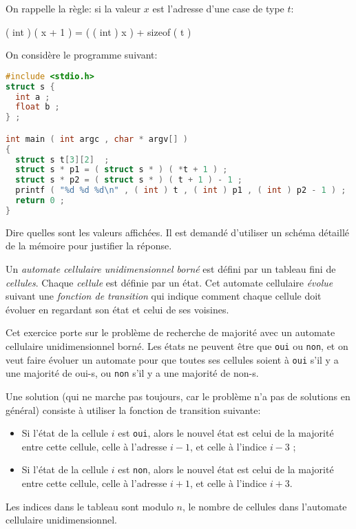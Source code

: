 

On rappelle la règle: si la valeur \(x\) est l'adresse d'une case de type \(t\):
\begin{center}
  ( int ) ( x + 1 ) = ( ( int ) x ) + sizeof ( t ) 
\end{center}


On considère le programme suivant:
\begin{lstlisting}[language=C]
#include <stdio.h>
struct s {
  int a ;
  float b ;
} ;

int main ( int argc , char * argv[] )
{
  struct s t[3][2]  ;
  struct s * p1 = ( struct s * ) ( *t + 1 ) ;
  struct s * p2 = ( struct s * ) ( t + 1 ) - 1 ;
  printf ( "%d %d %d\n" , ( int ) t , ( int ) p1 , ( int ) p2 - 1 ) ;
  return 0 ;
}
\end{lstlisting}

Dire quelles sont les valeurs affichées. Il est demandé d'utiliser un
schéma détaillé de la mémoire pour justifier la réponse.



  Un \emph{automate cellulaire unidimensionnel born{\'e}} est
  d{\'e}fini par un tableau fini de \emph{cellules}. Chaque \emph{cellule}
  est d{\'e}finie par un {\'e}tat. Cet automate cellulaire \emph{{\'e}volue} suivant une
  \emph{fonction de transition} qui indique comment chaque cellule doit 
  {\'e}voluer en regardant son {\'e}tat et celui de ses voisines.

  Cet exercice porte sur le probl{\`e}me de recherche de majorit{\'e} avec un
  automate cellulaire unidimensionnel born{\'e}. Les {\'e}tats ne peuvent
  {\^e}tre que \texttt{oui} ou \texttt{non}, et on veut faire {\'e}voluer un
  automate pour que toutes ses cellules soient {\`a} \texttt{oui} s'il y a
  une majorit{\'e} de oui-s, ou \texttt{non} s'il y a une majorit{\'e} de non-s.

  Une solution (qui ne marche pas toujours, car le probl{\`e}me n'a pas de
  solutions en g{\'e}n{\'e}ral) consiste {\`a} utiliser la fonction de transition
  suivante:
  \begin{itemize}
  \item Si l'{\'e}tat de la cellule $i$ est \texttt{oui}, alors le nouvel 
  {\'e}tat est celui de la majorit{\'e} entre cette cellule, celle {\`a} 
  l'adresse $i-1$, et celle {\`a} l'indice $i-3$ ;
  \item Si l'{\'e}tat de la cellule $i$ est \texttt{non}, alors le nouvel 
  {\'e}tat est celui de la majorit{\'e} entre cette cellule, celle {\`a} 
  l'adresse $i+1$, et celle {\`a} l'indice $i+3$.
  \end{itemize}
  Les indices dans le tableau sont modulo $n$, le nombre de cellules 
  dans l'automate cellulaire unidimensionnel.


